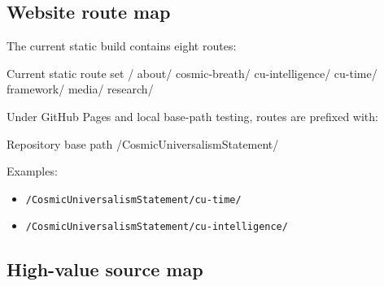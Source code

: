 \documentclass[11pt,letterpaper]{article}
\newcommand{\filepath}[1]{\nolinkurl{#1}}
\begin{document}
\subsection{Website route map}

The current static build contains eight routes:

\begin{codebox}{Current static route set}
/
about/
cosmic-breath/
cu-intelligence/
cu-time/
framework/
media/
research/
\end{codebox}

Under GitHub Pages and local base-path testing, routes are prefixed with:

\begin{codebox}{Repository base path}
/CosmicUniversalismStatement/
\end{codebox}

Examples:

\begin{itemize}
    \item \filepath{/CosmicUniversalismStatement/cu-time/}
    \item \filepath{/CosmicUniversalismStatement/cu-intelligence/}
\end{itemize}

\subsection{High-value source map}
\end{document}
